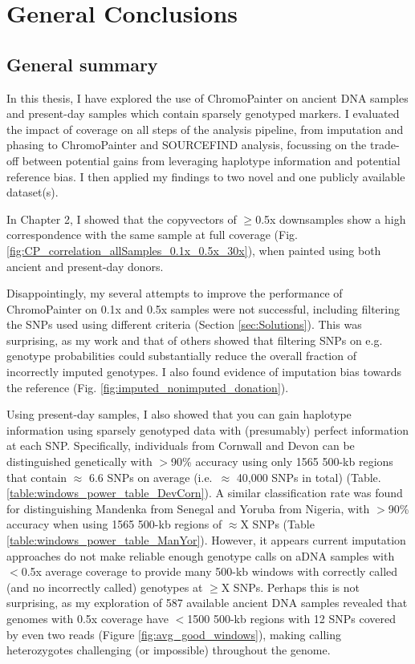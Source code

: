 \chapter{General Conclusions}
\label{chapterlabelConclusions}

\section{General summary}

In this thesis, I have explored the use of ChromoPainter on ancient DNA samples and present-day samples which contain sparsely genotyped markers. I evaluated the impact of coverage on all steps of the analysis pipeline, from imputation and phasing to ChromoPainter and SOURCEFIND analysis, focussing on the trade-off between potential gains from leveraging haplotype information and potential reference bias. I then applied my findings to two novel and one publicly available dataset(s). 

In Chapter 2, I showed that the copyvectors of $\geq$0.5x downsamples show a high correspondence with the same sample at full coverage (Fig. \ref{fig:CP_correlation_allSamples_0.1x_0.5x_30x}), when painted using both ancient and present-day donors. 

Disappointingly, my several attempts to improve the performance of ChromoPainter on 0.1x and 0.5x samples were not successful, including filtering the SNPs used using different criteria (Section \ref{sec:Solutions}). This was surprising, as my work and that of others \cite{hui2020evaluating} showed that filtering SNPs on e.g. genotype probabilities could substantially reduce the overall fraction of incorrectly imputed genotypes. I also found evidence of imputation bias towards the reference (Fig. \ref{fig:imputed_nonimputed_donation}).

Using present-day samples, I also showed that you can gain haplotype information using sparsely genotyped data with (presumably) perfect information at each SNP. Specifically, individuals from Cornwall and Devon can be distinguished genetically with $>$90\% accuracy using only 1565 500-kb regions that contain $\approx$ 6.6 SNPs on average (i.e.\ $\approx$ 40,000 SNPs in total) (Table. \ref{table:windows_power_table_DevCorn}). A similar classification rate was found for distinguishing Mandenka from Senegal and Yoruba from Nigeria, with $>$90\% accuracy when using 1565 500-kb regions of $\approx$X SNPs (Table \ref{table:windows_power_table_ManYor}). However, it appears current imputation approaches do not make reliable enough genotype calls on aDNA samples with $<$0.5x average coverage to provide many 500-kb windows with correctly called (and no incorrectly called) genotypes at $\geq$X SNPs. Perhaps this is not surprising, as my exploration of 587 available ancient DNA samples revealed that genomes with 0.5x coverage have $<$1500 500-kb regions with 12 SNPs covered by even two reads (Figure \ref{fig:avg_good_windows}), making calling heterozygotes challenging (or impossible) throughout the genome.

